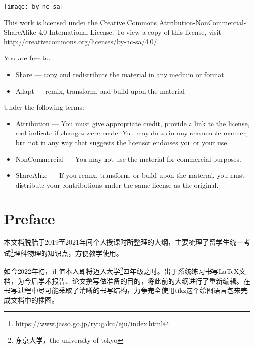 \clearpage
\begin{flushleft}
    \null

    \vfill
    \texttt{[image: by-nc-sa]}

    This work is licensed under the Creative Commons Attribution-NonCommercial-ShareAlike 4.0 International License. To view a copy of this license, visit http://creativecommons.org/licenses/by-nc-sa/4.0/.

    \vspace{1em}
    You are free to:
    \begin{itemize}
        \item Share — copy and redistribute the material in any medium or format
        \item Adapt — remix, transform, and build upon the material
    \end{itemize}

    Under the following terms:
    \begin{itemize}
        \item Attribution — You must give appropriate credit, provide a link to the license, and indicate if changes were made. You may do so in any reasonable manner, but not in any way that suggests the licensor endorses you or your use.
        \item NonCommercial — You may not use the material for commercial purposes.
        \item ShareAlike — If you remix, transform, or build upon the material, you must distribute your contributions under the same license as the original.
    \end{itemize}
\end{flushleft}


\clearpage
\chapter*{Preface}

本文档脱胎于2019至2021年间个人授课时所整理的大纲，主要梳理了留学生统一考试\footnote{https://www.jasso.go.jp/ryugaku/eju/index.html}理科物理的知识点，方便教学使用。

如今2022年初，正值本人即将迈入大学\footnote{东京大学，the university of tokyo}四年级之时。出于系统练习书写\LaTeX 文档，为今后学术报告、论文撰写做准备的目的，将此前的大纲进行了重新编辑。在书写过程中尽可能采取了清晰的书写结构，力争完全使用tikz这个绘图语言包来完成文档中的插图。

